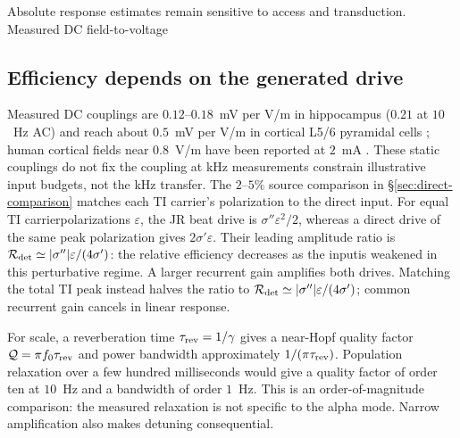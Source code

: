 \documentclass[11pt,a4paper]{article}
\newcommand{\Sig}{\sigma}
\providecommand{\DIFaddtex}[1]{{\protect\color{blue} \sf #1}} %
\providecommand{\DIFdeltex}[1]{{\protect\color{red} \scriptsize #1}} %
\providecommand{\DIFaddbegin}{} %
\providecommand{\DIFaddend}{} %
\providecommand{\DIFdelbegin}{} %
\providecommand{\DIFdelend}{} %
\providecommand{\DIFadd}[1]{\texorpdfstring{\DIFaddtex{#1}}{#1}} %
\providecommand{\DIFdel}[1]{\texorpdfstring{\DIFdeltex{#1}}{}} %
\begin{document}
\DIFdelbegin \DIFdel{Absolute response estimates remain sensitive to access and transduction.
Measured DC field-to-voltage }\DIFdelend \DIFaddbegin \subsection{\DIFadd{Efficiency depends on the generated drive}}
\DIFadd{Measured DC }\DIFaddend couplings are $0.12$--$0.18$~mV per V/m in hippocampus
($0.21$ at $10$~Hz\DIFdelbegin \DIFdel{AC}\DIFdelend ) \cite{bikson2004,deans2007} and reach \DIFdelbegin \DIFdel{about
}\DIFdelend $0.5$~mV per V/m
in cortical L5/6 pyramidal cells \cite{radman2009}; human cortical fields near
$0.8$~V/m have been reported at $2$~mA \cite{huang2017,huang2017corr}.
These \DIFdelbegin \DIFdel{static couplings do
not fix the coupling at kHz }\DIFdelend \DIFaddbegin \DIFadd{measurements constrain illustrative input budgets, not the kHz transfer.
The $2$--$5\%$ source comparison in \S\ref{sec:direct-comparison} matches
each TI carrier's polarization to the direct input}\DIFaddend . \DIFdelbegin \DIFdel{For equal TI carrierpolarizations $\varepsilon$,
the JR beat drive is $\Sig''\varepsilon^2/2$, whereas a direct drive of the same
peak polarization gives $2\Sig'\varepsilon$. Their leading amplitude ratio is
$\mathcal R_{\rm det}\simeq|\Sig''|\varepsilon/(4\Sig')$: the relative efficiency decreases
as the inputis weakened in this perturbative regime. A larger recurrent gain
amplifies both drives.
}\DIFdelend \DIFaddbegin \DIFadd{Matching the total TI
peak instead halves the ratio to
$\mathcal R_{\rm det}\simeq|\Sig''|\varepsilon/(4\Sig')$; common recurrent
gain cancels in linear response.
}\DIFaddend

\DIFdelbegin \DIFdel{For scale, a reverberation time $\tau_{\rm rev}=1/\gamma$ gives a near-Hopf
quality factor $\mathcal Q=\pi f_0\tau_{\rm rev}$ and power bandwidth
approximately $1/(\pi\tau_{\rm rev})$. Population relaxation over a few hundred
milliseconds \cite{wilting2018} would give a quality factor of order ten at
$10$~Hz and a bandwidth of order $1$~Hz. This is an order-of-magnitude comparison:
the measured relaxation is not specific to the alpha mode. Narrow amplification
also makes detuning consequential.
}%
\end{document}

